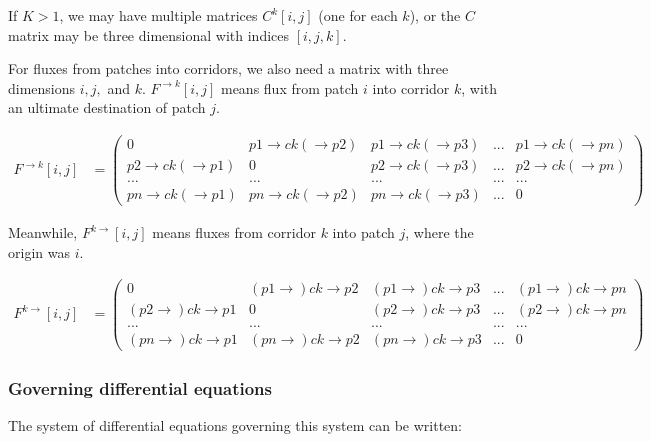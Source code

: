 \documentclass[
]{article}
\begin{document}
If \(K>1\), we may have multiple matrices \(C^k[i,j]\) (one for each
\(k\)), or the \(C\) matrix may be three dimensional with indices
\([i,j,k]\).

For fluxes from patches into corridors, we also need a matrix with three
dimensions \(i,j,\) and \(k\). \(F^{\rightarrow k}[i,j]\) means flux
from patch \(i\) into corridor \(k\), with an ultimate destination of
patch \(j\).


\begin{align*}
    F^{\rightarrow k}[i,j] &=
    \begin{pmatrix}
        0 & p1 \rightarrow ck (\rightarrow p2) & p1 \rightarrow ck (\rightarrow p3) & ... & p1 \rightarrow ck (\rightarrow pn) \\
        p2 \rightarrow ck (\rightarrow p1) & 0 & p2 \rightarrow ck (\rightarrow p3) & ... & p2 \rightarrow ck (\rightarrow pn) \\
        ... & ... & ... & ... & ... \\
        pn \rightarrow ck (\rightarrow p1) & pn \rightarrow ck (\rightarrow p2) & pn \rightarrow ck (\rightarrow p3) & ... & 0
    \end{pmatrix}
\end{align*}


Meanwhile, \(F^{k\rightarrow}[i,j]\) means fluxes from corridor \(k\)
into patch \(j\), where the origin was \(i\).


\begin{align*}
    F^{k \rightarrow}[i,j] &=
    \begin{pmatrix}
        0 & (p1 \rightarrow) ck \rightarrow p2 & (p1 \rightarrow) ck \rightarrow p3 & ... & (p1 \rightarrow) ck \rightarrow pn \\
        (p2 \rightarrow) ck \rightarrow p1 & 0 & (p2 \rightarrow) ck \rightarrow p3 & ... & (p2 \rightarrow) ck \rightarrow pn \\
        ... & ... & ... & ... & ... \\
        (pn \rightarrow) ck \rightarrow p1 & (pn \rightarrow) ck \rightarrow p2 & (pn \rightarrow) ck \rightarrow p3 & ... & 0
    \end{pmatrix}
\end{align*}


\subsubsection{Governing differential
equations}\label{governing-differential-equations}

The system of differential equations governing this system can be
written:
\end{document}
